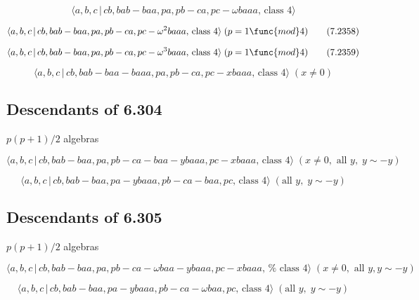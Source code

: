 \documentclass[10pt]{article}
\begin{document}
\begin{equation}
\langle a,b,c\,|\,cb,bab-baa,pa,pb-ca,pc-\omega baaa,\,\text{class }4\rangle
\tag{7.2357}
\end{equation}

\begin{equation}
\langle a,b,c\,|\,cb,bab-baa,pa,pb-ca,pc-\omega ^{2}baaa,\,\text{class }%
4\rangle \;(p=1\func{mod}4)  \tag{7.2358}
\end{equation}

\begin{equation}
\langle a,b,c\,|\,cb,bab-baa,pa,pb-ca,pc-\omega ^{3}baaa,\,\text{class }%
4\rangle \;(p=1\func{mod}4)  \tag{7.2359}
\end{equation}

\begin{equation}
\langle a,b,c\,|\,cb,bab-baa-baaa,pa,pb-ca,pc-xbaaa,\,\text{class }4\rangle
\;(x \neq 0)  \tag{7.2360}
\end{equation}

\subsection{Descendants of 6.304}

$p(p+1)/2$ algebras

\begin{equation}
\langle a,b,c\,|\,cb,bab-baa,pa,pb-ca-baa-ybaaa,pc-xbaaa,\,\text{class }%
4\rangle \;(x\neq 0,\text{ all }y,\;y\sim -y)  \tag{7.2361}
\end{equation}

\begin{equation}
\langle a,b,c\,|\,cb,bab-baa,pa-ybaaa,pb-ca-baa,pc,\,\text{class }4\rangle
\;(\text{all }y,\;y\sim -y)  \tag{7.2362}
\end{equation}

\subsection{Descendants of 6.305}

$p(p+1)/2$ algebras

\begin{equation}
\langle a,b,c\,|\,cb,bab-baa,pa,pb-ca-\omega baa-ybaaa,pc-xbaaa,\,\text{%
class }4\rangle \;(x\neq 0,\text{ all }y,y\sim -y)  \tag{7.2363}
\end{equation}

\begin{equation}
\langle a,b,c\,|\,cb,bab-baa,pa-ybaaa,pb-ca-\omega baa,pc,\,\text{class }%
4\rangle \;(\text{all }y,\;y\sim -y)  \tag{7.2364}
\end{equation}
\end{document}
